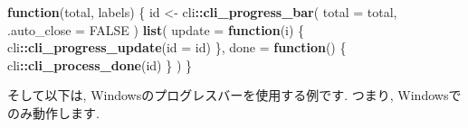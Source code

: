 \documentclass[
  lualatex,ja=standard,jafont=noto-otf]{bxjsreport}
\newenvironment{Shaded}{\begin{snugshade}}{\end{snugshade}}
\newcommand{\AttributeTok}[1]{\textcolor[rgb]{0.13,0.29,0.53}{#1}}
\newcommand{\ConstantTok}[1]{\textcolor[rgb]{0.56,0.35,0.01}{#1}}
\newcommand{\ControlFlowTok}[1]{\textcolor[rgb]{0.13,0.29,0.53}{\textbf{#1}}}
\newcommand{\FunctionTok}[1]{\textcolor[rgb]{0.13,0.29,0.53}{\textbf{#1}}}
\newcommand{\NormalTok}[1]{#1}
\newcommand{\OtherTok}[1]{\textcolor[rgb]{0.56,0.35,0.01}{#1}}
\newcommand{\SpecialCharTok}[1]{\textcolor[rgb]{0.81,0.36,0.00}{\textbf{#1}}}
\begin{document}
\begin{itemize}
\begin{Shaded}
\begin{Highlighting}[numbers=left,,]
\ControlFlowTok{function}\NormalTok{(total, labels) \{}
\NormalTok{  id }\OtherTok{\textless{}{-}}\NormalTok{ cli}\SpecialCharTok{::}\FunctionTok{cli\_progress\_bar}\NormalTok{(}
    \AttributeTok{total =}\NormalTok{ total, }\AttributeTok{.auto\_close =} \ConstantTok{FALSE}
\NormalTok{  )}
  \FunctionTok{list}\NormalTok{(}
    \AttributeTok{update =} \ControlFlowTok{function}\NormalTok{(i) \{}
\NormalTok{      cli}\SpecialCharTok{::}\FunctionTok{cli\_progress\_update}\NormalTok{(}\AttributeTok{id =}\NormalTok{ id)}
\NormalTok{    \},}
    \AttributeTok{done =} \ControlFlowTok{function}\NormalTok{() \{}
\NormalTok{      cli}\SpecialCharTok{::}\FunctionTok{cli\_process\_done}\NormalTok{(id)}
\NormalTok{    \}}
\NormalTok{  )}
\NormalTok{\}}
\end{Highlighting}
\end{Shaded}

  そして以下は, Windowsのプログレスバーを使用する例です. つまり,
  Windowsでのみ動作します.


\end{itemize}
\end{document}
